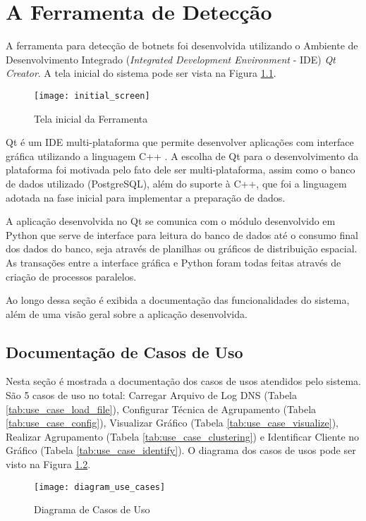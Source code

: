 \chapter{A Ferramenta de Detecção}
A ferramenta para detecção de botnets foi desenvolvida utilizando o Ambiente de Desenvolvimento Integrado (\textit{Integrated Development Environment} - IDE) \textit{Qt Creator}. A tela inicial do sistema pode ser vista na Figura \ref{fig:initial_screen}.

\begin{figure}
\centering
\texttt{[image: initial\_screen]}
\caption[Tela inicial da Ferramenta]{Tela inicial da Ferramenta} \label{fig:initial_screen}
\end{figure}

Qt é um IDE multi-plataforma que permite desenvolver aplicações com interface gráfica utilizando a linguagem C++ \citep{qtsite}. A escolha de Qt para o desenvolvimento da plataforma foi motivada pelo fato dele ser multi-plataforma, assim como o banco de dados utilizado (PostgreSQL), além do suporte à C++, que foi a linguagem adotada na fase inicial para implementar a preparação de dados.

A aplicação desenvolvida no Qt se comunica com o módulo desenvolvido em Python que serve de interface para leitura do banco de dados até o consumo final dos dados do banco, seja através de planilhas ou gráficos de distribuição espacial. As transações entre a interface gráfica e Python foram todas feitas através de criação de processos paralelos.

Ao longo dessa seção é exibida a documentação das funcionalidades do sistema, além de uma visão geral sobre a aplicação desenvolvida.

\section{Documentação de Casos de Uso}
Nesta seção é mostrada a documentação dos casos de usos atendidos pelo sistema. São 5 casos de uso no total: Carregar Arquivo de Log DNS (Tabela \ref{tab:use_case_load_file}), Configurar Técnica de Agrupamento (Tabela \ref{tab:use_case_config}), Visualizar Gráfico (Tabela \ref{tab:use_case_visualize}), Realizar Agrupamento (Tabela \ref{tab:use_case_clustering}) e Identificar Cliente no Gráfico (Tabela \ref{tab:use_case_identify}). O diagrama dos casos de usos pode ser visto na Figura \ref{fig:diagram_use_cases}. 

\begin{figure}
\centering
\texttt{[image: diagram\_use\_cases]}
\caption[Diagrama de Casos de Uso]{Diagrama de Casos de Uso} \label{fig:diagram_use_cases}
\end{figure}

